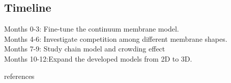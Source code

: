 \documentclass[12pt]{article}
\begin{document}
\begin{flushleft}
\subsection*{Timeline}
Months 0-3: Fine-tune the continuum membrane model.\\
Months 4-6: Investigate competition among different membrane shapes.\\
Months 7-9: Study chain model and crowding effect\\
Months 10-12:Expand the developed models from 2D to 3D.

\end{flushleft}
\newpage

 {references}  
\end{document}
